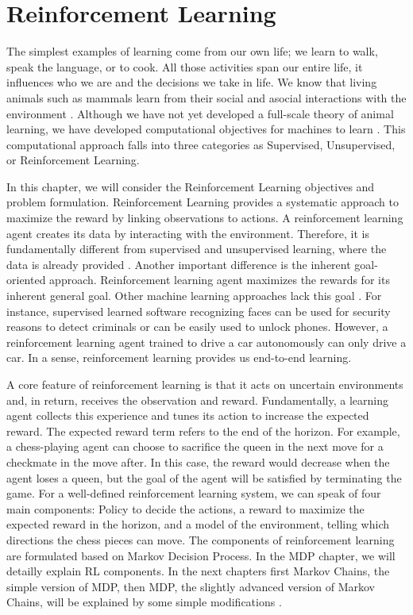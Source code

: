 
\section{Reinforcement Learning}

The simplest examples of learning come from our own life; we learn to walk, speak the language, or to cook. All those activities span our entire life, it influences who we are and the decisions we take in life. We know that living animals such as mammals learn from their social and asocial interactions with the environment \cite{AnimalInt11}. 
Although we have not yet developed a full-scale theory of animal learning, we have developed computational objectives for machines to learn \cite{Sutton2018}. 
This computational approach falls into three categories as Supervised, Unsupervised, or Reinforcement Learning.

In this chapter, we will consider the Reinforcement Learning objectives and problem formulation.
Reinforcement Learning provides a systematic approach to maximize the reward by linking observations to actions. A reinforcement learning agent creates its data by interacting with the environment. Therefore, it is fundamentally different from supervised and unsupervised learning, where the data is already provided \cite{Sutton2018}. 
Another important difference is the inherent goal-oriented approach. Reinforcement learning agent maximizes the rewards for its inherent general goal. Other machine learning approaches lack this goal \cite{Sutton2018}.
For instance, supervised learned software recognizing faces can be used for security reasons to detect criminals or can be easily used to unlock phones. However, a reinforcement learning agent trained to drive a car autonomously can only drive a car. In a sense, reinforcement learning provides us end-to-end learning.

A core feature of reinforcement learning is that it acts on uncertain environments and, in return, receives the observation and reward. Fundamentally, a learning agent collects this experience and tunes its action to increase the expected reward. The expected reward term refers to the end of the horizon. For example, a chess-playing agent can choose to sacrifice the queen in the next move for a checkmate in the move after. In this case, the reward would decrease when the agent loses a queen, but the goal of the agent will be satisfied by terminating the game. For a well-defined reinforcement learning system, we can speak of four main components: Policy to decide the actions, a reward to maximize the expected reward in the horizon, and a model of the environment, telling which directions the chess pieces can move. The components of reinforcement learning are formulated based on Markov Decision Process. In the MDP chapter, we will detailly explain RL components. In the next chapters first Markov Chains, the simple version of MDP, then MDP, the slightly advanced version of Markov Chains, will be explained by some simple modifications \cite{PerezMIT}.

